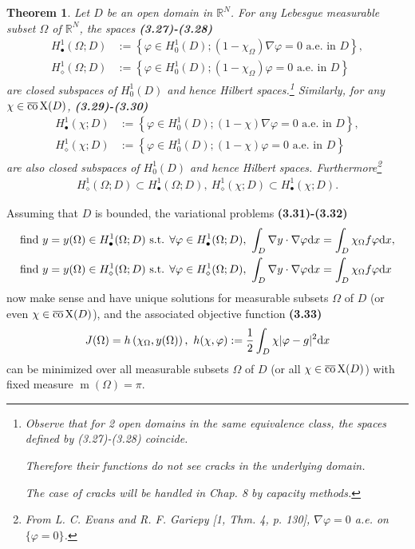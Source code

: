 \documentclass{book}
\numberwithin{equation}{section}
\newtheorem{theorem}{Theorem}[section]
\begin{document}
\begin{enumerate}
    \begin{theorem}
        Let $D$ be an open domain in $\mathbb{R}^N$. For any Lebesgue measurable subset $\Omega$ of $\mathbb{R}^N$, the spaces \textbf{(3.27)-(3.28)}
        \begin{align*}
            H_\bullet^1(\Omega;D) &:= \left\{\varphi\in H_0^1(D);(1 - \chi_\Omega)\nabla\varphi = 0 \mbox{ a.e. in } D\right\},\\
            H_\diamond^1(\Omega;D) &:= \left\{\varphi\in H_0^1(D);(1 - \chi_\Omega)\varphi = 0 \mbox{ a.e. in } D\right\}
        \end{align*}
        are closed subspaces of $H_0^1(D)$ and hence Hilbert spaces.\footnote{Observe that for 2 open domains in the same equivalence class, the spaces defined by (3.27)-(3.28) coincide.
            
            Therefore their functions do not see cracks in the underlying domain.
            
            The case of cracks will be handled in Chap. 8 by capacity methods.} Similarly, for any $\chi\in\overline{\rm co}\operatorname{X}(D)$, \textbf{(3.29)-(3.30)}
        \begin{align*}
            H_\bullet^1(\chi;D) &:= \left\{\varphi\in H_0^1(D);(1 - \chi)\nabla\varphi = 0 \mbox{ a.e. in } D\right\},\\
            H_\diamond^1(\chi;D) &:= \left\{\varphi\in H_0^1(D);(1 - \chi)\varphi = 0 \mbox{ a.e. in } D\right\}
        \end{align*}
        are also closed subspaces of $H_0^1(D)$ and hence Hilbert spaces. Furthermore\footnote{From L. C. Evans and R. F. Gariepy [1, Thm. 4, p. 130], $\nabla\varphi = 0$ a.e. on $\{\varphi = 0\}$.}    
        \begin{align*}
            H_\diamond^1(\Omega;D)\subset H_\bullet^1(\Omega;D),\ H_\diamond^1(\chi;D)\subset H_\bullet^1(\chi;D).
        \end{align*}
    \end{theorem}
    Assuming that $D$ is bounded, the variational problems \textbf{(3.31)-(3.32)}
    \begin{align*}
        \mbox{find } y &= y(\Omega)\in H_\bullet^1(\Omega;D) \mbox{ s.t. } \forall\varphi\in H_\bullet^1(\Omega;D),\ \int_D \nabla y\cdot\nabla\varphi{\rm d}x = \int_D \chi_\Omega f\varphi{\rm d}x,\\
        \mbox{find } y &= y(\Omega)\in H_\diamond^1(\Omega;D) \mbox{ s.t. } \forall\varphi\in H_\diamond^1(\Omega;D),\ \int_D \nabla y\cdot\nabla\varphi{\rm d}x = \int_D \chi_\Omega f\varphi{\rm d}x
    \end{align*}
    now make sense and have unique solutions for measurable subsets $\Omega$ of $D$ (or even $\chi\in\overline{\rm co}\operatorname{X}(D)$), and the associated objective function \textbf{(3.33)}
    \begin{align*}
        J(\Omega) = h\left(\chi_\Omega,y(\Omega)\right),\ h(\chi,\varphi) := \frac{1}{2}\int_D \chi|\varphi - g|^2{\rm d}x
    \end{align*}
    can be minimized over all measurable subsets $\Omega$ of $D$ (or all $\chi\in\overline{\rm co}\operatorname{X}(D)$) with fixed measure $\operatorname{m}(\Omega) = \pi$.
    

\end{enumerate}
\end{document}
